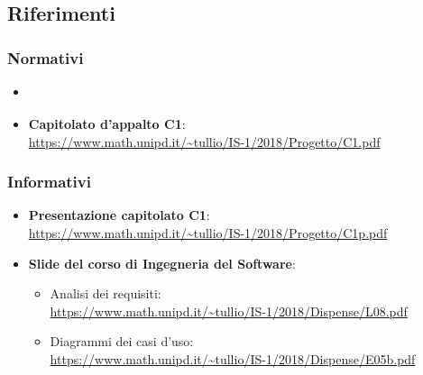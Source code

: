 	\subsection{Riferimenti}

	\subsubsection{Normativi}
	\begin{itemize}
		\item \textbf{\Doc{\NdPv}}
		\item \textbf{Capitolato d'appalto C1}:\\\url{https://www.math.unipd.it/~tullio/IS-1/2018/Progetto/C1.pdf}
	\end{itemize}

	\subsubsection{Informativi}
	\begin{itemize}
		\item \textbf{Presentazione capitolato C1}:\\\url{https://www.math.unipd.it/~tullio/IS-1/2018/Progetto/C1p.pdf}
		\item \textbf{Slide del corso di Ingegneria del Software}:
		\begin{itemize}
			\item Analisi dei requisiti:\\ \url{https://www.math.unipd.it/~tullio/IS-1/2018/Dispense/L08.pdf}
			\item Diagrammi dei casi d'uso:\\ \url{https://www.math.unipd.it/~tullio/IS-1/2018/Dispense/E05b.pdf}
		\end{itemize}
	\end{itemize}